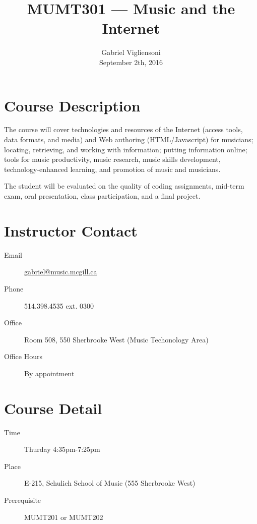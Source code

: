 \documentclass[11pt]{amsart}
\title{MUMT301 --- Music and the Internet}
\author{Gabriel Vigliensoni \\ September 2th, 2016}
\begin{document}
\maketitle
\section{Course Description} 

The course will cover technologies and resources of the Internet (access tools, data formats, and media) and Web authoring (HTML/Javascript) for musicians; locating, retrieving, and working with information; putting information online; tools for music productivity, music research, music skills development, technology-enhanced learning, and promotion of music and musicians. 

The student will be evaluated on the quality of coding assignments, mid-term exam, oral presentation, class participation, and a final project.



\section{Instructor Contact}
\begin{description}
\item[Email]\href{mailto:gabriel@music.mcgill.ca}{gabriel@music.mcgill.ca}
\item [Phone]514.398.4535 ext. 0300
\item [Office]Room 508, 550 Sherbrooke West (Music Techonology Area)
\item [Office Hours]By appointment
\end{description}

\section{Course Detail}
\begin{description}
\item [Time]Thurday 4:35pm-7:25pm
\item [Place]E-215, Schulich School of Music (555 Sherbrooke West)
\item [Prerequisite]MUMT201 or MUMT202
\end{description}
\end{document}
